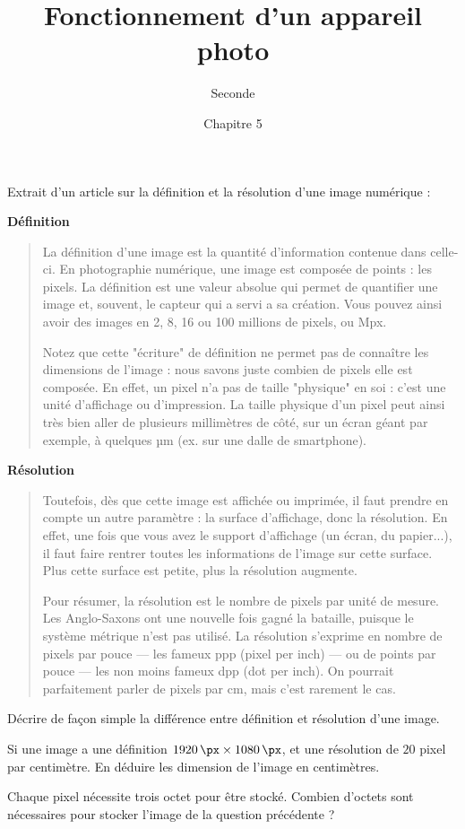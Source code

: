 \documentclass{exos}
\title{Fonctionnement d'un appareil photo}
\author{Seconde}
\date{Chapitre 5}
\begin{document}
\maketitle

\begin{exercize}
Extrait d'un article sur la définition et la résolution d'une image numérique :

\textbf{Définition}
\begin{quote}
La définition d'une image est la quantité d'information contenue dans celle-ci. En photographie numérique, une image est composée de points : les pixels. La définition est une valeur absolue qui permet de quantifier une image et, souvent, le capteur qui a servi a sa création. Vous pouvez ainsi avoir des images en 2, 8, 16 ou 100 millions de pixels, ou Mpx.

Notez que cette "écriture" de définition ne permet pas de connaître les dimensions de l'image : nous savons juste combien de pixels elle est composée. En effet, un pixel n'a pas de taille "physique" en soi : c'est une unité d'affichage ou d'impression. La taille physique d'un pixel peut ainsi très bien aller de plusieurs millimètres de côté, sur un écran géant par exemple, à quelques µm (ex. sur une dalle de smartphone).
\end{quote}

\textbf{Résolution}
\begin{quote}
Toutefois, dès que cette image est affichée ou imprimée, il faut prendre en compte un autre paramètre : la surface d'affichage, donc la résolution. En effet, une fois que vous avez le support d'affichage (un écran, du papier...), il faut faire rentrer toutes les informations de l'image sur cette surface. Plus cette surface est petite, plus la résolution augmente.

Pour résumer, la résolution est le nombre de pixels par unité de mesure. Les Anglo-Saxons ont une nouvelle fois gagné la bataille, puisque le système métrique n'est pas utilisé. La résolution s'exprime en nombre de pixels par pouce — les fameux ppp (pixel per inch) — ou de points par pouce — les non moins fameux dpp (dot per inch). On pourrait parfaitement parler de pixels par cm, mais c'est rarement le cas.
\end{quote}

\begin{alphaquestions}
\item Décrire de façon simple la différence entre définition et résolution d'une image.
\item Si une image a une définition $\qty{1920}{\px} \times \qty{1080}{\px}$, et une résolution de $20$ pixel par centimètre. En déduire les dimension de l'image en centimètres.
\item Chaque pixel nécessite trois octet pour être stocké. Combien d'octets sont nécessaires pour stocker l'image de la question précédente ? 
\end{alphaquestions}
\end{exercize}
\end{document}
